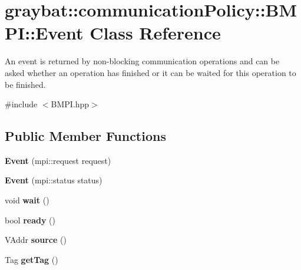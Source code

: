 \hypertarget{classgraybat_1_1communicationPolicy_1_1BMPI_1_1Event}{}\section{graybat\+:\+:communication\+Policy\+:\+:B\+M\+P\+I\+:\+:Event Class Reference}
\label{classgraybat_1_1communicationPolicy_1_1BMPI_1_1Event}


An event is returned by non-\/blocking communication operations and can be asked whether an operation has finished or it can be waited for this operation to be finished.  




{\ttfamily \#include $<$B\+M\+P\+I.\+hpp$>$}

\subsection*{Public Member Functions}
\begin{DoxyCompactItemize}
\item 
\hypertarget{classgraybat_1_1communicationPolicy_1_1BMPI_1_1Event_ab26d9b8c2006182b069a9e642fe145a8}{}{\bfseries Event} (mpi\+::request request)\label{classgraybat_1_1communicationPolicy_1_1BMPI_1_1Event_ab26d9b8c2006182b069a9e642fe145a8}

\item 
\hypertarget{classgraybat_1_1communicationPolicy_1_1BMPI_1_1Event_ad807f147dac5c9b5e112771890a10498}{}{\bfseries Event} (mpi\+::status status)\label{classgraybat_1_1communicationPolicy_1_1BMPI_1_1Event_ad807f147dac5c9b5e112771890a10498}

\item 
\hypertarget{classgraybat_1_1communicationPolicy_1_1BMPI_1_1Event_ae900e8d70e5ef1f65daa0454e5107f11}{}void {\bfseries wait} ()\label{classgraybat_1_1communicationPolicy_1_1BMPI_1_1Event_ae900e8d70e5ef1f65daa0454e5107f11}

\item 
\hypertarget{classgraybat_1_1communicationPolicy_1_1BMPI_1_1Event_a24f71a744d3b980e9f2f7dcf92fdf7b8}{}bool {\bfseries ready} ()\label{classgraybat_1_1communicationPolicy_1_1BMPI_1_1Event_a24f71a744d3b980e9f2f7dcf92fdf7b8}

\item 
\hypertarget{classgraybat_1_1communicationPolicy_1_1BMPI_1_1Event_a9fbb6d904385973406134ebdc4b0400f}{}V\+Addr {\bfseries source} ()\label{classgraybat_1_1communicationPolicy_1_1BMPI_1_1Event_a9fbb6d904385973406134ebdc4b0400f}

\item 
\hypertarget{classgraybat_1_1communicationPolicy_1_1BMPI_1_1Event_afb39c302ae3c18661d3aa5dbc17216f5}{}Tag {\bfseries get\+Tag} ()\label{classgraybat_1_1communicationPolicy_1_1BMPI_1_1Event_afb39c302ae3c18661d3aa5dbc17216f5}

\end{DoxyCompactItemize}


